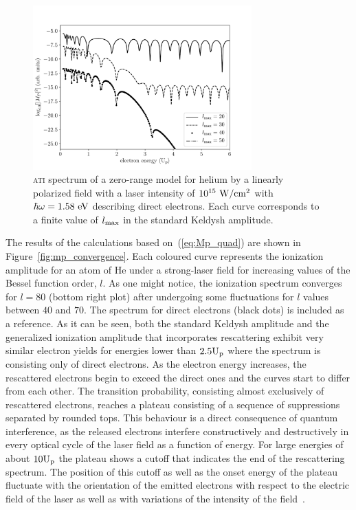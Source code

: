 \begin{figure}
  \centering
  \includegraphics[width=0.75\textwidth]{figures/ch_ATI_SFA/He/l20304050Keldysh.pdf}
\caption{\textsc{ati} spectrum of a zero-range model for helium by a
  linearly polarized field with a laser intensity of
  $10^{15}\ \rm{W/cm^{2}}$ with $\hbar\omega = 1.58\ \rm{eV}$
  describing direct electrons. Each curve corresponds to a finite
  value of $l_{\rm{max}}$ in the standard Keldysh amplitude.}
\label{fig:keldysh_convergence}
\end{figure}

The results of the calculations based on~(\ref{eq:Mp_quad}) are shown
in Figure~\ref{fig:mp_convergence}. Each coloured curve represents the
ionization amplitude for an atom of He under a strong-laser field for
increasing values of the Bessel function order, $l$. As one might
notice, the ionization spectrum converges for $l=80$ (bottom right
plot) after undergoing some fluctuations for $l$ values between $40$
and $70$. The spectrum for direct electrons (black dots) is included
as a reference. As it can be seen, both the standard Keldysh amplitude
and the generalized ionization amplitude that incorporates
rescattering exhibit very similar electron yields for energies lower
than $2.5\rm{U_{p}}$ where the spectrum is consisting only of direct
electrons. As the electron energy increases, the rescattered electrons
begin to exceed the direct ones and the curves start to differ from
each other. The transition probability, consisting almost exclusively
of rescattered electrons, reaches a plateau consisting of a sequence
of suppressions separated by rounded tops. This behaviour is a direct
consequence of quantum interference, as the released electrons
interfere constructively and destructively in every optical cycle of
the laser field as a function of energy. For large energies of about
$10\rm{U_{p}}$ the plateau shows a cutoff that indicates the end of
the rescattering spectrum. The position of this cutoff as well as the
onset energy of the plateau fluctuate with the orientation of the
emitted electrons with respect to the electric field of the laser as
well as with variations of the intensity of the
field~\cite{Kopold_1997sfa,Paulus_1994plateau,Becker_1994plateau_classical}.


